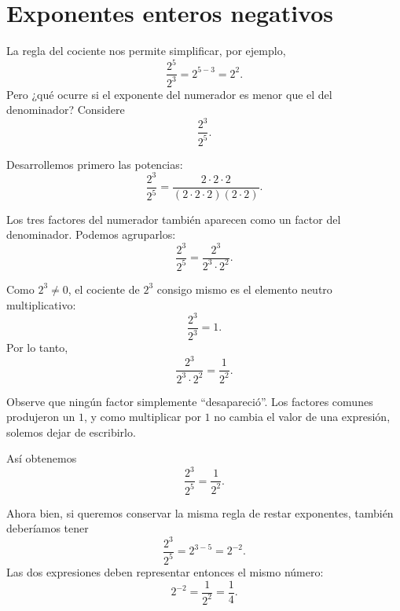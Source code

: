 \section{Exponentes enteros negativos}

La regla del cociente nos permite simplificar, por ejemplo,
\[
\frac{2^5}{2^3}=2^{5-3}=2^2.
\]
Pero ¿qué ocurre si el exponente del numerador es menor que el del denominador? Considere
\[
\frac{2^3}{2^5}.
\]

Desarrollemos primero las potencias:
\[
\frac{2^3}{2^5}
=
\frac{2\cdot2\cdot2}
{(2\cdot2\cdot2)(2\cdot2)}.
\]

Los tres factores del numerador también aparecen como un factor del denominador. Podemos agruparlos:
\[
\frac{2^3}{2^5}
=
\frac{2^3}{2^3\cdot2^2}.
\]

Como \(2^3\ne0\), el cociente de \(2^3\) consigo mismo es el elemento neutro multiplicativo:
\[
\frac{2^3}{2^3}=1.
\]
Por lo tanto,
\[
\frac{2^3}{2^3\cdot2^2}
=
\frac{1}{2^2}.
\]

Observe que ningún factor simplemente ``desapareció''. Los factores comunes produjeron un \(1\), y como multiplicar por \(1\) no cambia el valor de una expresión, solemos dejar de escribirlo.

Así obtenemos
\[
\frac{2^3}{2^5}
=
\frac{1}{2^2}.
\]

Ahora bien, si queremos conservar la misma regla de restar exponentes, también deberíamos tener
\[
\frac{2^3}{2^5}=2^{3-5}=2^{-2}.
\]
Las dos expresiones deben representar entonces el mismo número:
\[
2^{-2}=\frac1{2^2}=\frac14.
\]
